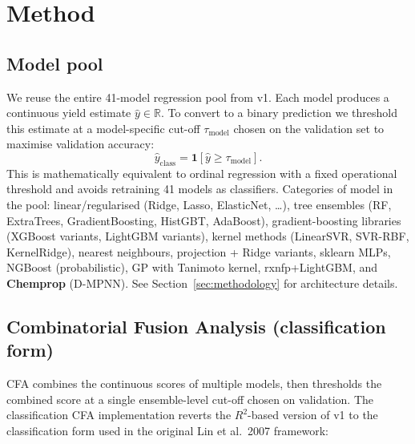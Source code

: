 \documentclass[11pt,a4paper]{article}
\begin{document}
\section{Method}

\subsection{Model pool}

We reuse the entire 41-model regression pool from v1. Each model produces a
continuous yield estimate $\hat y \in \mathbb{R}$. To convert to a binary
prediction we threshold this estimate at a model-specific cut-off
$\tau_{\text{model}}$ chosen on the validation set to maximise validation
accuracy:
\[
\hat y_{\text{class}} = \mathbf{1}\!\left[\hat y \geq \tau_{\text{model}}\right].
\]
This is mathematically equivalent to ordinal regression with a fixed
operational threshold and avoids retraining 41 models as classifiers.
Categories of model in the pool: linear/regularised (Ridge, Lasso, ElasticNet,
\ldots), tree ensembles (RF, ExtraTrees, GradientBoosting, HistGBT,
AdaBoost), gradient-boosting libraries (XGBoost variants, LightGBM variants),
kernel methods (LinearSVR, SVR-RBF, KernelRidge), nearest neighbours,
projection + Ridge variants, sklearn MLPs, NGBoost (probabilistic), GP with
Tanimoto kernel, rxnfp+LightGBM, and \textbf{Chemprop} (D-MPNN). See
Section~\ref{sec:methodology} for architecture details.

\subsection{Combinatorial Fusion Analysis (classification form)}

CFA combines the continuous scores of multiple models, then thresholds the
combined score at a single ensemble-level cut-off chosen on validation. The
classification CFA implementation reverts the $R^2$-based version of v1 to the
classification form used in the original Lin et al.\ 2007 framework:
\end{document}
